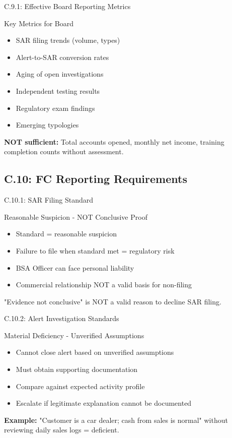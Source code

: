 \documentclass{beamer}
\begin{document}
	\begin{frame}{C.9.1: Effective Board Reporting Metrics}
		\begin{block}{Key Metrics for Board}
			\begin{itemize}
				\item SAR filing trends (volume, types)
				\item Alert-to-SAR conversion rates
				\item Aging of open investigations
				\item Independent testing results
				\item Regulatory exam findings
				\item Emerging typologies
			\end{itemize}
		\end{block}
		\textbf{NOT sufficient:} Total accounts opened, monthly net income, training completion counts without assessment.
	\end{frame}
	
	\subsection{C.10: FC Reporting Requirements}
	
	\begin{frame}{C.10.1: SAR Filing Standard}
		\begin{block}{Reasonable Suspicion - NOT Conclusive Proof}
			\begin{itemize}
				\item Standard = reasonable suspicion
				\item Failure to file when standard met = regulatory risk
				\item BSA Officer can face personal liability
				\item Commercial relationship NOT a valid basis for non-filing
			\end{itemize}
		\end{block}
		\textcolor{red}{\textbf{}} "Evidence not conclusive" is NOT a valid reason to decline SAR filing.
	\end{frame}
	
	\begin{frame}{C.10.2: Alert Investigation Standards}
		\begin{block}{Material Deficiency - Unverified Assumptions}
			\begin{itemize}
				\item Cannot close alert based on unverified assumptions
				\item Must obtain supporting documentation
				\item Compare against expected activity profile
				\item Escalate if legitimate explanation cannot be documented
			\end{itemize}
		\end{block}
		\textbf{Example:} "Customer is a car dealer; cash from sales is normal" without reviewing daily sales logs = deficient.
	\end{frame}
	
\end{document}

